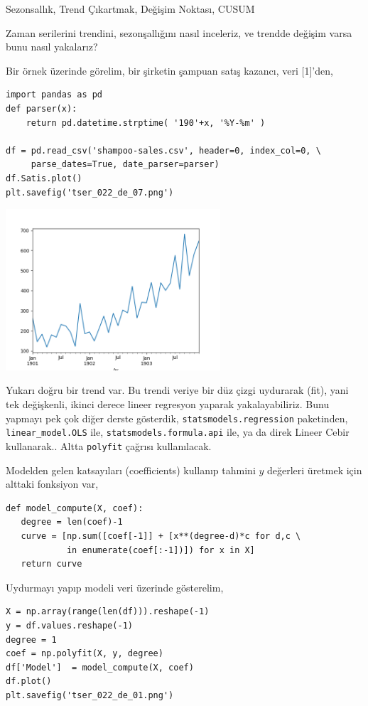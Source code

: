 \documentclass[12pt,fleqn]{article}\usepackage{../../common}
\begin{document}
Sezonsallık, Trend Çıkartmak, Değişim Noktası, CUSUM

Zaman serilerini trendini, sezonşallığını nasıl inceleriz, ve trendde
değişim varsa bunu nasıl yakalarız? 

Bir örnek üzerinde görelim, bir şirketin şampuan satış kazancı, veri [1]'den,

\begin{verbatim}
import pandas as pd
def parser(x):
    return pd.datetime.strptime( '190'+x, '%Y-%m' )
    
df = pd.read_csv('shampoo-sales.csv', header=0, index_col=0, \
     parse_dates=True, date_parser=parser)
df.Satis.plot()
plt.savefig('tser_022_de_07.png')
\end{verbatim}

\includegraphics[height=6cm]{tser_022_de_07.png}

Yukarı doğru bir trend var. Bu trendi veriye bir düz çizgi uydurarak (fit), yani
tek değişkenli, ikinci derece lineer regresyon yaparak yakalayabiliriz. Bunu
yapmayı pek çok diğer derste gösterdik, \verb!statsmodels.regression!
paketinden, \verb!linear_model.OLS! ile, \verb!statsmodels.formula.api! ile,
ya da direk Lineer Cebir kullanarak.. Altta \verb!polyfit!  çağrısı
kullanılacak.

Modelden gelen katsayıları (coefficients) kullanıp tahmini $y$ değerleri üretmek
için alttaki fonksiyon var,

\begin{verbatim}
def model_compute(X, coef):
   degree = len(coef)-1
   curve = [np.sum([coef[-1]] + [x**(degree-d)*c for d,c \
            in enumerate(coef[:-1])]) for x in X]
   return curve
\end{verbatim}

Uydurmayı yapıp modeli veri üzerinde gösterelim,

\begin{verbatim}
X = np.array(range(len(df))).reshape(-1)
y = df.values.reshape(-1)
degree = 1
coef = np.polyfit(X, y, degree)
df['Model']  = model_compute(X, coef)
df.plot()
plt.savefig('tser_022_de_01.png')
\end{verbatim}
\end{document}
